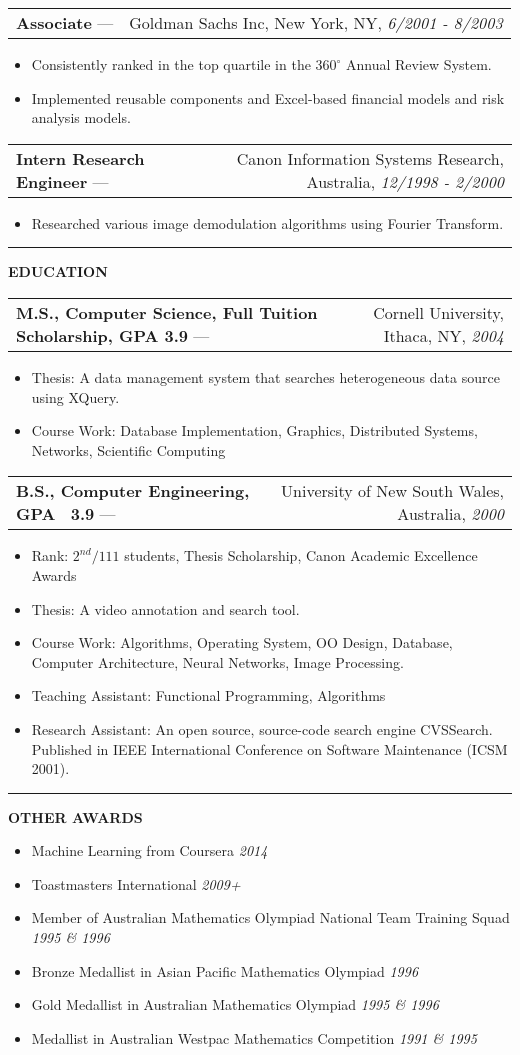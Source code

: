 \documentclass[11pt]{article}
\makeatletter
\newcommand{\resheading}[1]{\vspace{1pt}\textbf{#1}}
\newcommand{\ressubheading}[4]{\vspace{6pt}
    \begin{tabular*}{\textwidth}{@{}l@{\extracolsep{\fill}}r@{}}
        \textbf{#1} --- & #3, #2, \textit{#4} \\
\end{tabular*}}
\newcommand{\resitem}[1]{\item #1}
\newcommand{\resawarditem}[2]{\item #1 \hfill \textit{#2}}
\newcommand{\ressep}{\vspace{6pt}\hrule\vspace{6pt}}
\makeatother
\begin{document}
\ressubheading{Associate}{New York, NY}{Goldman Sachs Inc}{6/2001 - 8/2003}
\begin{itemize}
\resitem{Consistently ranked in the top quartile in the $360^{\circ}$ Annual Review System.}
\resitem{Implemented reusable components and Excel-based financial models and risk analysis models.}
\end{itemize}

\ressubheading{Intern Research Engineer}{Australia}{Canon Information Systems Research}{12/1998 - 2/2000}
\begin{itemize}
\resitem{Researched various image demodulation algorithms using Fourier Transform.}
\end{itemize}

\ressep{}
\resheading{EDUCATION}

\ressubheading{M.S., Computer Science, Full Tuition Scholarship, GPA 3.9}{Ithaca, NY}{Cornell University}{2004}
\begin{itemize}
\resitem{Thesis: A data management system that searches heterogeneous data source using XQuery.}
\resitem{Course Work: Database Implementation, Graphics, Distributed Systems, Networks, Scientific Computing}
\end{itemize}

\ressubheading{B.S., Computer Engineering, GPA ~3.9}{Australia}{University of New South Wales}{2000}
\begin{itemize}
\resitem{Rank: $2^{nd}/111$ students, Thesis Scholarship, Canon Academic Excellence Awards}
\resitem{Thesis: A video annotation and search tool.}
\resitem{Course Work: Algorithms, Operating System, OO Design, Database, Computer Architecture, Neural Networks, Image Processing.}
\resitem{Teaching Assistant: Functional Programming, Algorithms}
\resitem{Research Assistant: An open source, source-code search engine CVSSearch. Published in IEEE International Conference on Software Maintenance (ICSM 2001).}
\end{itemize}

\ressep{}
\resheading{OTHER AWARDS}

\begin{itemize}
\resawarditem{Machine Learning from Coursera}{2014}
\resawarditem{Toastmasters International}{2009+}
\resawarditem{Member of Australian Mathematics Olympiad National Team Training Squad}{1995 \& 1996}
\resawarditem{Bronze Medallist in Asian Pacific Mathematics Olympiad}{1996}
\resawarditem{Gold Medallist in Australian Mathematics Olympiad}{1995 \& 1996}
\resawarditem{Medallist in Australian Westpac Mathematics Competition}{1991 \& 1995}
\end{itemize}
\end{document}

